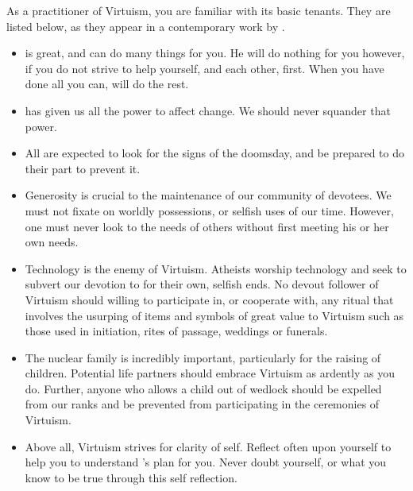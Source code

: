 \documentclass[blue]{guildcamp1}
\begin{document}
\name{\bVirtuism{}}

As a practitioner of Virtuism, you are familiar with its basic tenants. They are listed below, as they appear in a contemporary work by \cPastor{\MYname{}}.

\begin{itemize}
  \item \cGod{\MYname{}} is great, and can do many things for you. He will do nothing for you however, if you do not strive to help yourself, and each other, first. When you have done all you can, \cGod{\MYname{}} will do the rest.
  
  \item \cGod{\MYname{}} has given us all the power to affect change. We should never squander that power. 
  
  \item All are expected to look for the signs of the doomsday, and be prepared to do their part to prevent it. 
  
  \item Generosity is crucial to the maintenance of our community of devotees. We must not fixate on worldly possessions, or selfish uses of our time. However, one must never look to the needs of others without first meeting his or her own needs.
  
  \item Technology is the enemy of Virtuism. Atheists worship technology and seek to subvert our devotion to \cGod{\MYname{}} for their own, selfish ends. No devout follower of Virtuism should willing to participate in, or cooperate with, any ritual that involves the usurping of items and symbols of great value to Virtuism such as those used in initiation, rites of passage, weddings or funerals.
  
  \item The nuclear family is incredibly important, particularly for the raising of children. Potential life partners should embrace Virtuism as ardently as you do. Further, anyone who allows a child out of wedlock should be expelled from our ranks and be prevented from participating in the ceremonies of Virtuism.
  
  \item Above all, Virtuism strives for clarity of self. Reflect often upon yourself to help you to understand \cGod{\MYname{}}'s plan for you. Never doubt yourself, or what you know to be true through this self reflection.
\end{itemize}
\end{document}
